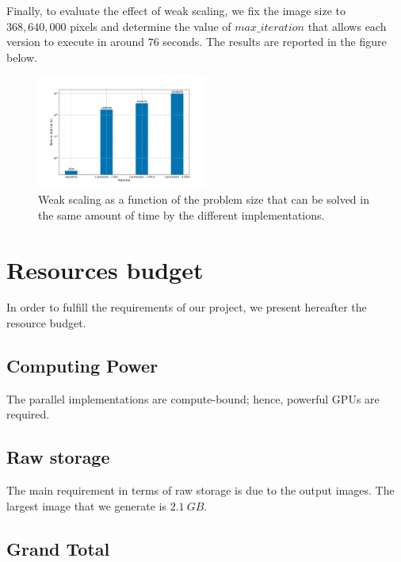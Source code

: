 \documentclass[11pt,a4paper]{article}
\begin{document}
Finally, to evaluate the effect of weak scaling, we fix the image size to $368,640,000$ pixels and determine the value of $max\_iteration$ that allows each version to execute in around $76$ seconds.
The results are reported in the figure below.
\begin{figure}[H]
	\centering
	\includegraphics[width = 0.5\textwidth, clip, trim={1.5cm 1cm 2cm 2cm}]{weak.pdf}
	\caption{Weak scaling as a function of the problem size that can be solved in the same amount of time by the different implementations.}
	\label{fig:weak}
\end{figure}


\section{Resources budget}
\vspace{-0.1cm}
In order to fulfill the requirements of our project, we present hereafter the resource budget. 

\vspace{-0.2cm}
\subsection{Computing Power}
\vspace{-0.1cm}
The parallel implementations are compute-bound; hence, powerful GPUs are required.

\vspace{-0.2cm}
\subsection{Raw storage}
\vspace{-0.1cm}
The main requirement in terms of raw storage is due to the output images.
The largest image that we generate is $2.1~GB$.

\vspace*{-1cm}
\subsection{Grand Total}
\end{document}
